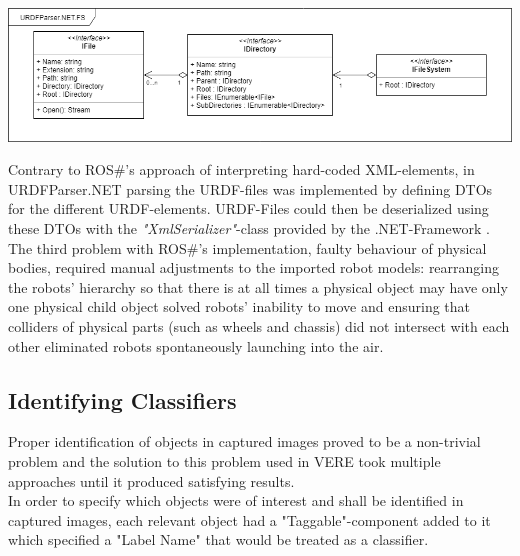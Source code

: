 \begin{center}
\noindent\includegraphics[width=14cm]{tex/img/ch05/URDFParser_FileSystemInterfaces03.png}
\label{fig:filesystem}
\end{center}
Contrary to ROS\#'s approach of interpreting hard-coded XML-elements, in URDFParser.NET parsing the URDF-files was implemented by defining \acp{DTO} for the different URDF-elements. URDF-Files could then be deserialized using these \acsp{DTO} with the \textit{"XmlSerializer"}-class provided by the .NET-Framework \cite{XmlSerializer}.\\
The third problem with ROS\#'s implementation, faulty behaviour of physical bodies, required manual adjustments to the imported robot models: rearranging the robots' hierarchy so that there is at all times a physical object may have only one physical child object solved robots' inability to move and ensuring that colliders of physical parts (such as wheels and chassis) did not intersect with each other eliminated robots spontaneously launching into the air. 

\subsection{Identifying Classifiers}
Proper identification of objects in captured images proved to be a non-trivial problem and the solution to this problem used in VERE took multiple approaches until it produced satisfying results.\\
In order to specify which objects were of interest and shall be identified in captured images, each relevant object had a "Taggable"-component added to it which specified a "Label Name" that would be treated as a classifier. 

